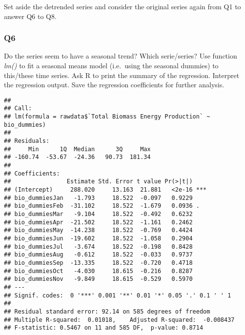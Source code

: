 \documentclass[
]{article}
\newenvironment{Shaded}{\begin{snugshade}}{\end{snugshade}}
\newcommand{\AttributeTok}[1]{\textcolor[rgb]{0.77,0.63,0.00}{#1}}
\newcommand{\CommentTok}[1]{\textcolor[rgb]{0.56,0.35,0.01}{\textit{#1}}}
\newcommand{\DecValTok}[1]{\textcolor[rgb]{0.00,0.00,0.81}{#1}}
\newcommand{\DocumentationTok}[1]{\textcolor[rgb]{0.56,0.35,0.01}{\textbf{\textit{#1}}}}
\newcommand{\FunctionTok}[1]{\textcolor[rgb]{0.00,0.00,0.00}{#1}}
\newcommand{\NormalTok}[1]{#1}
\newcommand{\OtherTok}[1]{\textcolor[rgb]{0.56,0.35,0.01}{#1}}
\newcommand{\SpecialCharTok}[1]{\textcolor[rgb]{0.00,0.00,0.00}{#1}}
\newcommand{\StringTok}[1]{\textcolor[rgb]{0.31,0.60,0.02}{#1}}
\begin{document}
Set aside the detrended series and consider the original series again
from Q1 to answer Q6 to Q8.

\hypertarget{q6}{%
\subsubsection{Q6}\label{q6}}

Do the series seem to have a seasonal trend? Which serie/series? Use
function \emph{lm()} to fit a seasonal means model (i.e.~using the
seasonal dummies) to this/these time series. Ask R to print the summary
of the regression. Interpret the regression output. Save the regression
coefficients for further analysis.

\begin{Shaded}
\end{Shaded}

\begin{verbatim}
## 
## Call:
## lm(formula = rawdata$`Total Biomass Energy Production` ~ bio_dummies)
## 
## Residuals:
##     Min      1Q  Median      3Q     Max 
## -160.74  -53.67  -24.36   90.73  181.34 
## 
## Coefficients:
##                Estimate Std. Error t value Pr(>|t|)    
## (Intercept)     288.020     13.163  21.881   <2e-16 ***
## bio_dummiesJan   -1.793     18.522  -0.097   0.9229    
## bio_dummiesFeb  -31.102     18.522  -1.679   0.0936 .  
## bio_dummiesMar   -9.104     18.522  -0.492   0.6232    
## bio_dummiesApr  -21.502     18.522  -1.161   0.2462    
## bio_dummiesMay  -14.238     18.522  -0.769   0.4424    
## bio_dummiesJun  -19.602     18.522  -1.058   0.2904    
## bio_dummiesJul   -3.674     18.522  -0.198   0.8428    
## bio_dummiesAug   -0.612     18.522  -0.033   0.9737    
## bio_dummiesSep  -13.335     18.522  -0.720   0.4718    
## bio_dummiesOct   -4.030     18.615  -0.216   0.8287    
## bio_dummiesNov   -9.849     18.615  -0.529   0.5970    
## ---
## Signif. codes:  0 '***' 0.001 '**' 0.01 '*' 0.05 '.' 0.1 ' ' 1
## 
## Residual standard error: 92.14 on 585 degrees of freedom
## Multiple R-squared:  0.01018,    Adjusted R-squared:  -0.008437 
## F-statistic: 0.5467 on 11 and 585 DF,  p-value: 0.8714
\end{verbatim}
\end{document}
